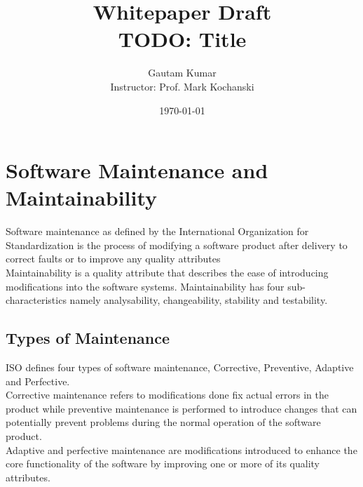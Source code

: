 \documentclass[dvips,12pt]{article}
\begin{document}

\title{Whitepaper Draft\\
TODO: Title}
\author{Gautam Kumar\\
Instructor: Prof. Mark Kochanski}
\date{\today}


\maketitle
\newpage
\tableofcontents
\newpage

\section{Software Maintenance and Maintainability}
Software maintenance as defined by the International Organization for Standardization is the process of modifying a software product after delivery to correct faults or to improve any quality attributes \cite{_international_2006} \\

Maintainability is a quality attribute that describes the ease of introducing modifications into the software systems. Maintainability has four sub-characteristics namely analysability, changeability, stability and testability\cite{_international_2006}.\\

\subsection{Types of Maintenance}
ISO defines four types of software maintenance, Corrective, Preventive, Adaptive and Perfective. \\

Corrective maintenance refers to modifications done fix actual errors in the product while preventive maintenance is performed to introduce changes that can potentially prevent problems during the normal operation of the software product. \\

Adaptive and perfective maintenance are modifications introduced to enhance the core functionality of the software by improving one or more of its quality attributes. 
\end{document}

